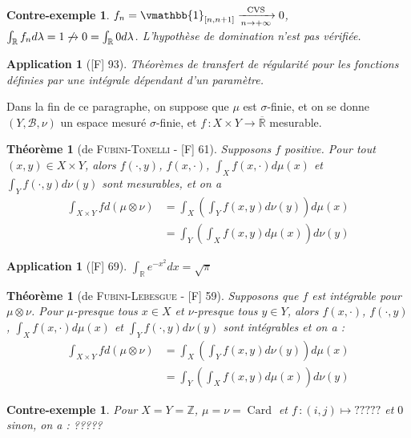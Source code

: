 \documentclass[10pt, a4paper, parskip=full, twoside, twocolumn]{report}
\newtheorem{theorem}[definition]{Théorème}
\newtheorem{cexample}[definition]{Contre-exemple}
\newtheorem{application}[definition]{Application}
\newcommand{\IZ}{\mathbb{Z}}
\newcommand{\IR}{\mathbb{R}}
\newcommand{\B}{\mathcal{B}}
\DeclareMathOperator{\card}{Card}
\begin{document}
\begin{cexample}
	$f_n = \vmathbb{1}_{[n,n+1]} \xrightarrow[n\to +\infty]{\text{CVS}} 0$,$\int_{\IR} f_n d\lambda = 1 \not \xrightarrow{} 0 = \int_{\IR} 0d\lambda$.
	L'hypothèse de domination n'est pas vérifiée.
\end{cexample}

\begin{application}[\textnormal{[F] 93}]
	Théorèmes de transfert de régularité pour les fonctions définies par une intégrale dépendant d'un paramètre.
\end{application}

\textcolor{paragraphtext}{Dans la fin de ce paragraphe, on suppose que $\mu$ est $\sigma$-finie, et on se donne $(Y,\B, \nu)$ un espace mesuré $\sigma$-finie, et $f\,\colon X\times Y\to \overline{\IR}$ mesurable.}

\begin{theorem}[de \textsc{Fubini-Tonelli} - \textnormal{[F] 61}]
	Supposons $f$ positive.
	Pour tout $(x,y)\in X\times Y$, alors $f(\cdot, y)$, $f(x,\cdot)$, $\int_X f(x,\cdot)d\mu(x)$ et $\int_Y f(\cdot, y)d\nu(y)$ sont mesurables, et on a 
	\begin{align*}
		\int_{X\times Y} fd(\mu\otimes \nu) &= \int_X\left(\int_Y f(x,y)d\nu(y)\right)d\mu(x) \\ 
		&= \int_Y\left(\int_X f(x,y)d\mu(x)\right)d\nu(y)
	\end{align*}
\end{theorem}

\begin{application}[\textnormal{[F] 69}]
	$\int_{\IR} e^{-x^2}dx = \sqrt{\pi}$
\end{application}

\begin{theorem}[de \textsc{Fubini-Lebesgue} - \textnormal{[F] 59}]
	Supposons que $f$ est intégrable pour $\mu\otimes\nu$. 
	Pour $\mu$-presque tous $x\in X$ et $\nu$-presque tous $y\in Y$, alors
	$f(x,\cdot)$, $f(\cdot, y)$, $\int_Xf(x,\cdot)d\mu(x)$ et $\int_Yf(\cdot,y)d\nu(y)$ sont intégrables et on a :
	\begin{align*}
		\int_{X\times Y} fd(\mu\otimes \nu) &= \int_X\left(\int_Y f(x,y)d\nu(y)\right)d\mu(x) \\ 
		&= \int_Y\left(\int_X f(x,y)d\mu(x)\right)d\nu(y)
	\end{align*}
\end{theorem}

\begin{cexample}
	Pour $X = Y = \IZ$, $\mu=\nu=\card$ et $f\,\colon (i,j)\mapsto ?????$ et $0$ sinon, on a :
	?????
\end{cexample}
\end{document}
